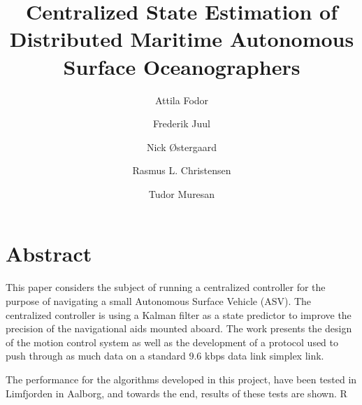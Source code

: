 \documentclass{article}
\begin{document}
\title{Centralized State Estimation of Distributed Maritime Autonomous Surface Oceanographers}
\author{Attila Fodor \and Frederik Juul \and Nick \O stergaard \and Rasmus L. Christensen \and Tudor Muresan}
\maketitle
\section*{Abstract}
This paper considers the subject of running a centralized controller for the purpose of navigating a small Autonomous Surface Vehicle (ASV). The centralized controller is using a Kalman filter as a state predictor to improve the precision of the navigational aids mounted aboard. The work presents the design of the motion control system as well as the development of a protocol used to push through as much data on a standard 9.6 kbps data link simplex link.

The performance for the algorithms developed in this project, have been tested in Limfjorden in Aalborg, and towards the end, results of these tests are shown. R
\end{document}
